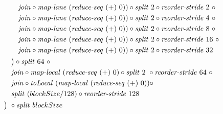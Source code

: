 \begin{align*}
\begin{aligned}
    &\qquad\qquad \join \circ \mapLane\ (\reduceSeq\ (+)\ 0))\circ \splitN\ 2 \circ \reorderStride\ 2\ \circ\\
    &\qquad\qquad \join \circ \mapLane\ (\reduceSeq\ (+)\ 0))\circ \splitN\ 2 \circ \reorderStride\ 4\ \circ\\
    &\qquad\qquad \join \circ \mapLane\ (\reduceSeq\ (+)\ 0))\circ \splitN\ 2 \circ \reorderStride\ 8\ \circ\\
    &\qquad\qquad \join \circ \mapLane\ (\reduceSeq\ (+)\ 0))\circ \splitN\ 2 \circ \reorderStride\ 16\ \circ\\
    &\qquad\qquad \join \circ \mapLane\ (\reduceSeq\ (+)\ 0))\circ \splitN\ 2 \circ \reorderStride\ 32\\
    &\qquad\quad\big)\circ \splitN\ 64\ \circ\\
    &\qquad\quad\join \circ \mapLocal\ (\reduceSeq\ (+)\ 0) \circ \splitN\ 2\ \circ \reorderStride\ 64\ \circ \\
    &\qquad\quad\join \circ \toLocal\ (\mapLocal\ (\reduceSeq\ (+)\ 0)) \circ\\
    &\qquad\quad \splitN\ (blockSize/128)\circ \reorderStride\ 128\\
    &\qquad\big)\ \circ \splitN\ blockSize
  \end{aligned}
%  
\end{align*}

\normalsize
